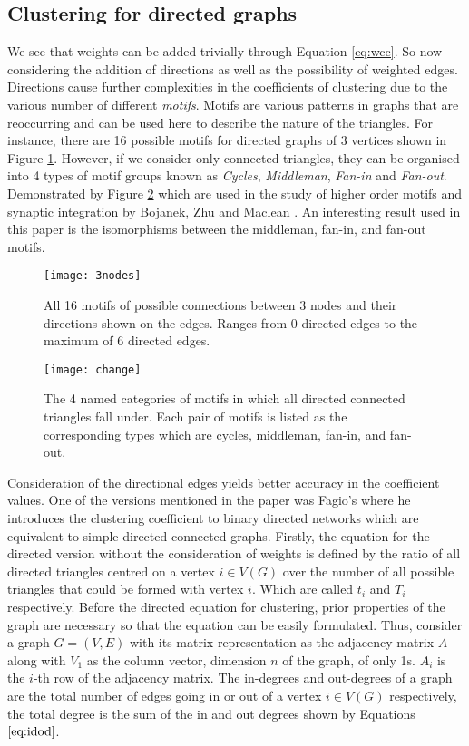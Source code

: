 \subsection{Clustering for directed graphs}

We see that weights can be added trivially through Equation \ref{eq:wcc}. So now considering the addition of directions as well as the possibility of weighted edges. Directions cause further complexities in the coefficients of clustering due to the various number of different \emph{motifs}. Motifs are various patterns in graphs that are reoccurring and can be used here to describe the nature of the triangles. For instance, there are 16 possible motifs for directed graphs of 3 vertices shown in Figure \ref{fig:3nodes}. However, if we consider only connected triangles, they can be organised into 4 types of motif groups known as \emph{Cycles}, \emph{Middleman}, \emph{Fan-in} and \emph{Fan-out}. Demonstrated by Figure \ref{fig:change} which are used in the study of higher order motifs and synaptic integration by Bojanek, Zhu and Maclean \cite{synaptic}. An interesting result used in this paper is the isomorphisms between the middleman, fan-in, and fan-out motifs.

\begin{figure}[!htb]
	\centering
	\texttt{[image: 3nodes]}
	\caption{All 16 motifs of possible connections between 3 nodes and their directions shown on the edges. Ranges from 0 directed edges to the maximum of 6 directed edges.}
	\label{fig:3nodes}
\end{figure}

\begin{figure}[!htb]
	\centering
	\texttt{[image: change]}
	\caption{The 4 named categories of motifs in which all directed connected triangles fall under. Each pair of motifs is listed as the corresponding types which are cycles, middleman, fan-in, and fan-out.}
	\label{fig:change}
\end{figure}

Consideration of the directional edges yields better accuracy in the coefficient values. One of the versions mentioned in the paper \cite{PhysRevResearch.3.043124} was Fagio's where he introduces the clustering coefficient to binary directed networks which are equivalent to simple directed connected graphs. Firstly, the equation for the directed version without the consideration of weights is defined by the ratio of all directed triangles centred on a vertex $i \in V(G)$ over the number of all possible triangles that could be formed with vertex $i$. Which are called $t_{i}$ and $T_{i}$ respectively. Before the directed equation for clustering, prior properties of the graph are necessary so that the equation can be easily formulated. Thus, consider a graph $G = (V, E)$ with its matrix representation as the adjacency matrix $A$ along with $V_1$ as the column vector, dimension $n$ of the graph, of only 1s. $A_i$ is the $i$-th row of the adjacency matrix. The in-degrees and out-degrees of a graph are the total number of edges going in or out of a vertex $i\in V(G)$ respectively, the total degree is the sum of the in and out degrees shown by Equations $\ref{eq:idod}$.

